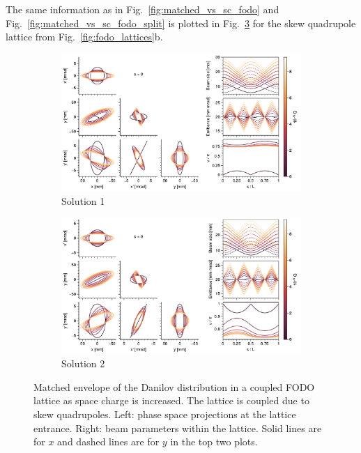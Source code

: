 The same information as in Fig.~\ref{fig:matched_vs_sc_fodo} and Fig.~\ref{fig:matched_vs_sc_fodo_split} is plotted in Fig.~\ref{fig:matched_vs_sc_fodo_skew} for the skew quadrupole lattice from Fig.~\ref{fig:fodo_lattices}b.
%
\begin{figure}[!p]
    \begin{subfigure}{1.0\textwidth}
        \includegraphics[width=\textwidth]{Images/chapter2/matched_vs_sc_fodo_skew_mode1.pdf}
        \caption{Solution 1}
        \label{fig:matched_vs_sc_fodo_skew_a}
    \end{subfigure}
    \vfill
    \vfill
    \begin{subfigure}{1.0\textwidth}
        \centering
        \includegraphics[width=\textwidth]{Images/chapter2/matched_vs_sc_fodo_skew_mode2.pdf}
        \caption{Solution 2}
        \label{fig:matched_vs_sc_fodo_skew_b}
    \end{subfigure}
    \caption{Matched envelope of the Danilov distribution in a coupled FODO lattice as space  charge is increased. The lattice is coupled due to skew quadrupoles. Left: phase space projections at the lattice entrance. Right: beam parameters within the lattice. Solid lines are for $x$ and dashed lines are for $y$ in the top two plots.}
    \label{fig:matched_vs_sc_fodo_skew}
\end{figure}
